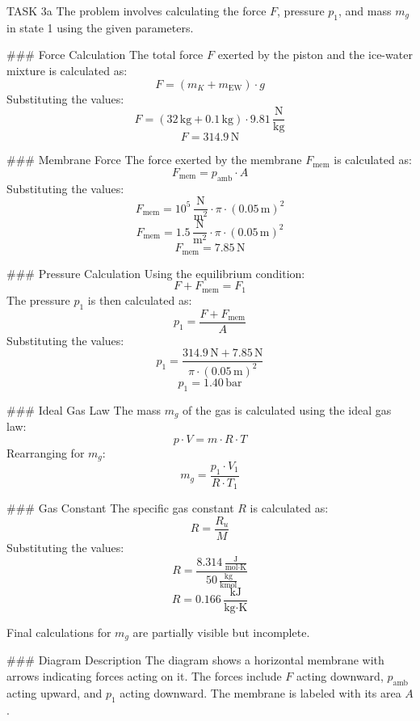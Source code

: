 TASK 3a  
The problem involves calculating the force \( F \), pressure \( p_1 \), and mass \( m_g \) in state 1 using the given parameters.  

### Force Calculation  
The total force \( F \) exerted by the piston and the ice-water mixture is calculated as:  
\[
F = (m_K + m_{\text{EW}}) \cdot g
\]  
Substituting the values:  
\[
F = (32 \, \text{kg} + 0.1 \, \text{kg}) \cdot 9.81 \, \frac{\text{N}}{\text{kg}}
\]  
\[
F = 314.9 \, \text{N}
\]  

### Membrane Force  
The force exerted by the membrane \( F_{\text{mem}} \) is calculated as:  
\[
F_{\text{mem}} = p_{\text{amb}} \cdot A
\]  
Substituting the values:  
\[
F_{\text{mem}} = 10^5 \, \frac{\text{N}}{\text{m}^2} \cdot \pi \cdot (0.05 \, \text{m})^2
\]  
\[
F_{\text{mem}} = 1.5 \, \frac{\text{N}}{\text{m}^2} \cdot \pi \cdot (0.05 \, \text{m})^2
\]  
\[
F_{\text{mem}} = 7.85 \, \text{N}
\]  

### Pressure Calculation  
Using the equilibrium condition:  
\[
F + F_{\text{mem}} = F_1
\]  
The pressure \( p_1 \) is then calculated as:  
\[
p_1 = \frac{F + F_{\text{mem}}}{A}
\]  
Substituting the values:  
\[
p_1 = \frac{314.9 \, \text{N} + 7.85 \, \text{N}}{\pi \cdot (0.05 \, \text{m})^2}
\]  
\[
p_1 = 1.40 \, \text{bar}
\]  

### Ideal Gas Law  
The mass \( m_g \) of the gas is calculated using the ideal gas law:  
\[
p \cdot V = m \cdot R \cdot T
\]  
Rearranging for \( m_g \):  
\[
m_g = \frac{p_1 \cdot V_1}{R \cdot T_1}
\]  

### Gas Constant  
The specific gas constant \( R \) is calculated as:  
\[
R = \frac{R_u}{M}
\]  
Substituting the values:  
\[
R = \frac{8.314 \, \frac{\text{J}}{\text{mol} \cdot \text{K}}}{50 \, \frac{\text{kg}}{\text{kmol}}}
\]  
\[
R = 0.166 \, \frac{\text{kJ}}{\text{kg} \cdot \text{K}}
\]  

Final calculations for \( m_g \) are partially visible but incomplete.  

### Diagram Description  
The diagram shows a horizontal membrane with arrows indicating forces acting on it. The forces include \( F \) acting downward, \( p_{\text{amb}} \) acting upward, and \( p_1 \) acting downward. The membrane is labeled with its area \( A \).  

